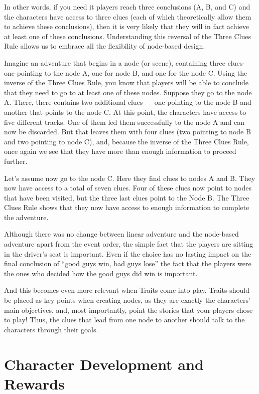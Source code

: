 \begin{multicols}{2}
In other words, if you need it players reach three conclusions (A, B, and C) and the characters have access to three clues (each of which theoretically allow them to achieve these conclusions), then it is very likely that they will in fact achieve at least one of these conclusions. Understanding this reversal of the Three Clues Rule allows us to embrace all the flexibility of node-based design.

Imagine an adventure that begins in a node (or scene), containing three clues- one pointing to the node A, one for node B, and one for the node C\@{}. Using the inverse of the Three Clues Rule, you know that players will be able to conclude that they need to go to at least one of these nodes. Suppose they go to the node A\@{}. There, there contains two additional clues --- one pointing to the node B and another that points to the node C\@{}. At this point, the characters have access to five different tracks. One of them led them successfully to the node A and can now be discarded. But that leaves them with four clues (two pointing to node B and two pointing to node C), and, because the inverse of the Three Clues Rule, once again we see that they have more than enough information to proceed further.

Let's assume now go to the node C\@{}. Here they find clues to nodes A and B\@{}. They now have access to a total of seven clues. Four of these clues now point to nodes that have been visited, but the three last clues point to the Node B\@{}. The Three Clues Rule shows that they now have access to enough information to complete the adventure.

Although there was no change between linear adventure and the node-based adventure apart from the event order, the simple fact that the players are sitting in the driver's seat is important. Even if the choice has no lasting impact on the final conclusion of “good guys win, bad guys lose” the fact that the players were the ones who decided how the good guys did win is important.

And this becomes even more relevant when Traits come into play. Traits should be placed as key points when creating nodes, as they are exactly the characters’ main objectives, and, most importantly, point the stories that your players chose to play! Thus, the clues that lead from one node to another should talk to the characters through their goals.
\end{multicols}

\section{Character Development and Rewards}\label{sec:gm-chardev}
